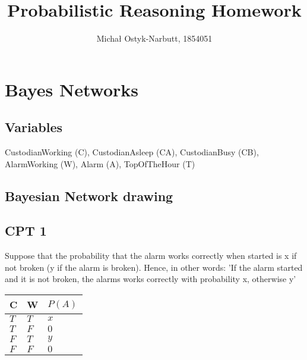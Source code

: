 \documentclass[12pt,a4paper]{article}
\begin{document}
\title{Probabilistic Reasoning Homework}
\author{Michał Ostyk-Narbutt, 1854051}
\maketitle
\tableofcontents
\clearpage
\section{Bayes Networks}

\subsection{Variables}
CustodianWorking (C),  CustodianAsleep (CA), CustodianBusy (CB), AlarmWorking (W), Alarm (A), TopOfTheHour (T)
\subsection{Bayesian Network drawing}
\begin{figure}[h]
\centering


\end{figure}

\subsection{CPT 1}
Suppose that the probability that the alarm works correctly when started is x if not
broken (y if the alarm is broken). Hence, in other words: 'If the alarm started and it is not broken, the alarms works correctly with probability x, otherwise y'
\begin{table}[h]
\centering
\begin{tabular}{|l|l|l|}
\hline
C & W  & $P(A)$ \\ \hline
$T$    & $T$     &  $x $         \\ \hline
$T$     & $F$   &    $0$       \\ \hline
$F$    & $T$     &   $y$        \\ \hline
$F$    & $F$    &   $0$         \\ \hline
\end{tabular}
\end{table}
\end{document}
